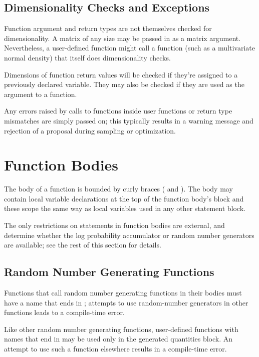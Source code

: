 \subsection{Dimensionality Checks and Exceptions}

Function argument and return types are not themselves checked for
dimensionality.  A matrix of any size may be passed in as a matrix
argument.  Nevertheless, a user-defined function might call a function
(such as a multivariate normal density) that itself does
dimensionality checks.

Dimensions of function return values will be checked if they're
assigned to a previously declared variable.  They may also be checked
if they are used as the argument to a function.

Any errors raised by calls to functions inside user functions or
return type mismatches are simply passed on;  this typically results
in a warning message and rejection of a proposal during sampling or
optimization.

\section{Function Bodies}\label{function-bodies.section}

The body of a function is bounded by curly braces (\code{\{} and
\code{\}}).  The body may contain local variable declarations at the
top of the function body's block and these scope the same way as local
variables used in any other statement block.

The only restrictions on statements in function bodies are external,
and determine whether the log probability accumulator or random
number generators are available;  see the rest of this section for details.

\subsection{Random Number Generating Functions}

Functions that call random number generating functions in their bodies
must have a name that ends in ; attempts to use
random-number generators in other functions leads to a compile-time
error.

Like other random number generating functions, user-defined functions
with names that end in  may be used only in the generated
quantities block.  An attempt to use such a function elsewhere results
in a compile-time error.


